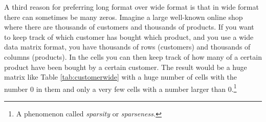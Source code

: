 \documentclass[]{book}\usepackage[]{graphicx}\usepackage[]{color}
\begin{document}
%
%
%
%
%

A third reason for preferring long format over wide format is that in wide format there can sometimes be many zeros. Imagine a large well-known online shop where there are thousands of customers and thousands of products. If you want to keep track of which customer has bought which product, and you use a wide data matrix format, you have thousands of rows (customers) and thousands of columns (products). In the cells you can then keep track of how many of a certain product have been bought by a certain customer. The result would be a huge matrix like Table \ref{tab:customerwide} with a huge number of cells with the number 0 in them and only a very few cells with a number larger than 0.\footnote{A phenomenon called \textit{sparsity} or \textit{sparseness.}}
\end{document}
